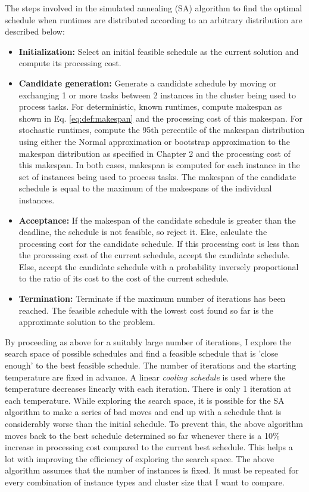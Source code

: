 \documentclass[12pt]{report}
\begin{document}
The steps involved in the simulated annealing (SA) algorithm to find the optimal schedule when runtimes are distributed according to an arbitrary distribution are described below:
\begin{itemize}
	\item \textbf{Initialization:} Select an initial feasible schedule as the current solution and compute its processing cost.
	\item \textbf{Candidate generation:} Generate a candidate schedule by moving or exchanging 1 or more tasks between 2 instances in the cluster being used to process tasks. 
		For deterministic, known runtimes, compute makespan as shown in Eq. \ref{eq:def:makespan} and the processing cost of this makespan.
		For stochastic runtimes, compute the 95th percentile of the makespan distribution using either the Normal approximation or bootstrap approximation to the makespan distribution as specified in Chapter 2 and the processing cost of this makespan. In both cases, makespan is computed for each instance in the set of instances being used to process tasks. The makespan of the candidate schedule is equal to the maximum of the makespans of the individual instances.
	\item \textbf{Acceptance:} If the makespan of the candidate schedule is greater than the deadline, the schedule is not feasible, so reject it.
		Else, calculate the processing cost for the candidate schedule.
		If this processing cost is less than the processing cost of the current schedule, accept the candidate schedule.
		Else, accept the candidate schedule with a probability inversely proportional to the ratio of its cost to the cost of the current schedule.
	\item \textbf{Termination:} Terminate if the maximum number of iterations has been reached. The feasible schedule with the lowest cost found so far is the approximate solution to the problem.
\end{itemize}

By proceeding as above for a suitably large number of iterations, I explore the search space of possible schedules and find a feasible schedule that is 'close enough' to the best feasible schedule. 
The number of iterations and the starting temperature are fixed in advance.
A linear \textit{cooling schedule} is used where the temperature decreases linearly with each iteration.
There is only 1 iteration at each temperature. 
While exploring the search space, it is possible for the SA algorithm to make a series of bad moves and end up with a schedule that is considerably worse than the initial schedule.
To prevent this, the above algorithm moves back to the best schedule determined so far whenever there is a 10\% increase in processing cost compared to the current best schedule.
This helps a lot with improving the efficiency of exploring the search space.
The above algorithm assumes that the number of instances is fixed.
It must be repeated for every combination of instance types and cluster size that I want to compare.
\end{document}
